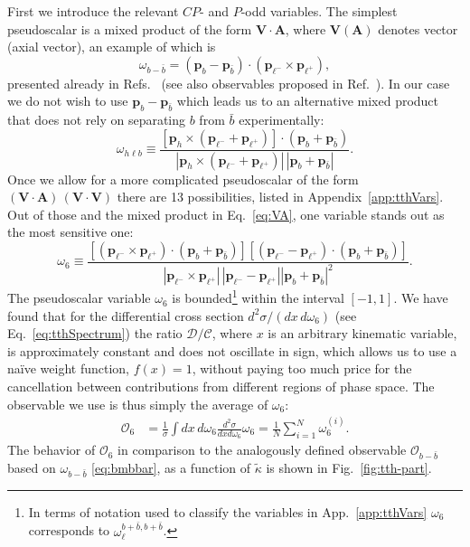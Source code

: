 \documentclass[11pt,a4paper]{article}
\newcommand{\mc}[1]{\mathcal{#1}}
\newcommand{\lp}{\bm{p}_{\ell^+}}
\newcommand{\lm}{\bm{p}_{\ell^-}}
\renewcommand{\b}{\bm{p}_b}
\newcommand{\bbar}{\bm{p}_{\bar{b}}}
\newcommand{\h}{\bm{p}_h}
\begin{document}
First we introduce the relevant $CP$- and $P$-odd variables.  The simplest pseudoscalar is a mixed product of the form
$\bm{V} \cdot \bm{A}$, where $\bm{V} (\bm{A})$ denotes vector (axial vector), an example of which is
\begin{equation}
\label{eq:bmbbar}
\mc{\omega}_{b-\bar{b}}=(\b-\bbar)\cdot (\lm \times \lp),
\end{equation}  
presented already in Refs.~\cite{ hep-ph/9312210, Boudjema:2015nda} (see also observables proposed in Ref.~\cite{1603.03632}). In our case we do not wish to use $\b -\bbar$ which leads us to an alternative mixed product that does not rely
on separating $b$ from $\bar b$ experimentally:
\begin{equation}
  \label{eq:VA}
  \omega_{h\ell b} \equiv \frac{\left[\h \times (\lm + \lp) \right]\cdot(\b +\bbar)}{|\h\times (\lm+\lp)| \,|\b+\bbar|}.
\end{equation}
Once we allow for a more complicated pseudoscalar of the form $(\bm{V} \cdot \bm{A}) \, (\bm{V}\cdot \bm{V})$
there are 13 possibilities, listed in Appendix~\ref{app:tthVars}. Out of those and the mixed product in Eq.~\eqref{eq:VA}, one variable stands out as the most sensitive one:
\begin{equation}
  \label{eq:O6}
  \omega_6 \equiv \frac{\left[(\lm \times \lp) \cdot (\b+\bbar)\right] \left[(\lm - \lp)\cdot (\b+\bbar)\right]}{|\lm \times \lp|\,|\lm-\lp| |\b+\bbar|^2}.
\end{equation}
The pseudoscalar variable $\omega_6$ is bounded\footnote{In terms of notation used to classify the variables in App.~\ref{app:tthVars} $\omega_6$ corresponds to $\omega_\ell^{b+\bar b,b+\bar b}$.} within the interval $[-1,1]$. We have found that for the differential cross section $d^2\sigma/(dx\,d\omega_6)$ (see Eq.~\eqref{eq:tthSpectrum}) the ratio $\mc{D}/\mc{C}$, where $x$ is an arbitrary kinematic variable, is approximately constant and does not oscillate in sign, which allows us to use a na\"ive weight function, $f(x) = 1$, without paying too much price for the cancellation between contributions from different regions of phase space. The observable we use is thus simply the average of $\omega_6$:
\begin{equation}
  \label{eq:Oomega6}
  \begin{split}   
  \mc{O}_6 &= \frac{1}{\sigma} \int dx\,d\omega_6 \frac{d^2\sigma}{dx
    d\omega_6} \omega_6  = \frac{1}{N}\sum_{i=1}^N \omega_6^{(i)}.
\end{split}
\end{equation}
The behavior of $\mc{O}_6$ in comparison to the analogously defined observable $\mc{O}_{b-\bar{b}}$ based on $\omega_{b-\bar{b}}$ \eqref{eq:bmbbar}, as a function of $\tilde \kappa$ is shown in Fig.~\ref{fig:tth-part}.\\
\end{document}
